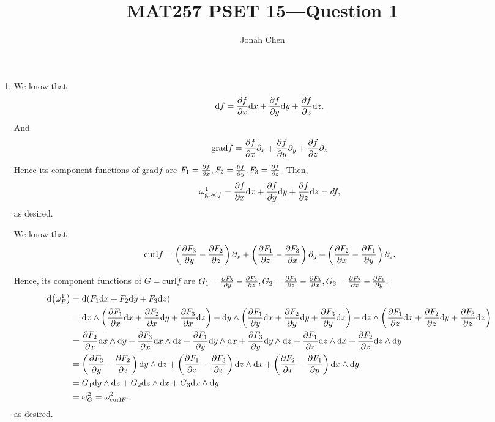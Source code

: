 \documentclass{exam}
\title{MAT257 PSET 15---Question 1}
\author{Jonah Chen}
\date{}
\numberwithin{equation}{section}
\begin{document}
    \sffamily
    \maketitle
    \begin{enumerate}[label=\alph*)]
        \item We know that \[\dd f=\partialderivative{f}{x}\dd x+\partialderivative{f}{y}\dd y+\partialderivative{f}{z}\dd z.\] And \[\mathrm{grad}f=\partialderivative{f}{x}\partial_x+\partialderivative{f}{y}\partial_y+\partialderivative{f}{z}\partial_z\]
        Hence its component functions of \(\mathrm{grad}f\) are \(F_1=\partialderivative{f}{x},F_2=\partialderivative{f}{y},F_3=\partialderivative{f}{z}.\) Then,
        \[\omega_{\mathrm{grad}f}^1=\partialderivative{f}{x}\dd x+\partialderivative{f}{y}\dd y+\partialderivative{f}{z}\dd z=df,\]
        as desired. 

        We know that \[\mathrm{curl}f=\left(\partialderivative{F_3}{y}-\partialderivative{F_2}{z}\right)\partial_x+\left(\partialderivative{F_1}{z}-\partialderivative{F_3}{x}\right)\partial_y+\left(\partialderivative{F_2}{x}-\partialderivative{F_1}{y}\right)\partial_z.\]

        Hence, its component functions of \(G=\mathrm{curl}f\) are \(G_1=\partialderivative{F_3}{y}-\partialderivative{F_2}{z},G_2=\partialderivative{F_1}{z}-\partialderivative{F_3}{x},G_3=\partialderivative{F_2}{x}-\partialderivative{F_1}{y}.\)
        \begin{align*}
            \dd(\omega_F^1)&=\dd(F_1\dd x+F_2\dd y+F_3\dd z)\\
            &=\dd x\wedge\left(\partialderivative{F_1}{x}\dd x+\partialderivative{F_2}{x}\dd y+\partialderivative{F_3}{x}\dd z\right)+\dd y\wedge\left(\partialderivative{F_1}{y}\dd x+\partialderivative{F_2}{y}\dd y+\partialderivative{F_3}{y}\dd z\right)+\dd z\wedge\left(\partialderivative{F_1}{z}\dd x+\partialderivative{F_2}{z}\dd y+\partialderivative{F_3}{z}\dd z\right)\\
            &=\partialderivative{F_2}{x}\dd x\wedge\dd y+\partialderivative{F_3}{x}\dd x\wedge\dd z+\partialderivative{F_1}{y}\dd y\wedge\dd x+\partialderivative{F_3}{y}\dd y\wedge\dd z+\partialderivative{F_1}{z}\dd z\wedge\dd x+\partialderivative{F_2}{z}\dd z\wedge\dd y\\
            &=\left(\partialderivative{F_3}{y}-\partialderivative{F_2}{z}\right)\dd y\wedge\dd z+\left(\partialderivative{F_1}{z}-\partialderivative{F_3}{x}\right)\dd z\wedge\dd x+\left(\partialderivative{F_2}{x}-\partialderivative{F_1}{y}\right)\dd x\wedge\dd y\\
            &=G_1\dd y\wedge\dd z+G_2\dd z\wedge\dd x+G_3\dd x\wedge\dd y\\
            &=\omega_G^2=\omega_{\mathrm{curl}F}^2,
        \end{align*}
        as desired.


\end{enumerate}
\end{document}
